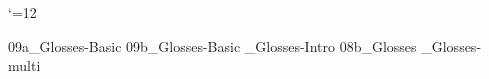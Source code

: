 


 \catcode`\@=12







%




\get 09a_Glosses-Basic
\get 09b_Glosses-Basic
%
\bye
{}_Glosses-Intro
\get 08b_Glosses
_Glosses-multi

